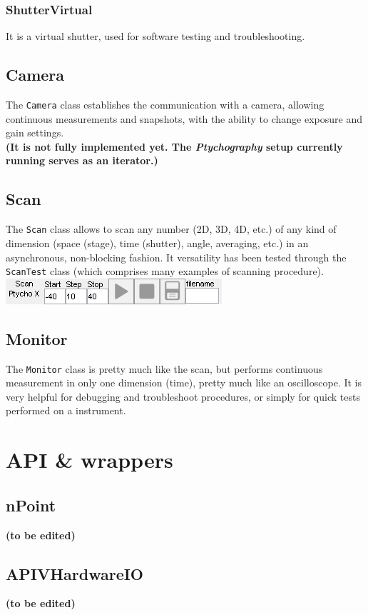 \documentclass[10pt,letter,twoside]{report}
\newcommand{\temp}[1] {{\bf (#1)}}
\begin{document}
\subsubsection{ShutterVirtual}
It is a virtual shutter, used for software testing and troubleshooting.

\subsection{Camera}
The \verb!Camera! class establishes the communication with a camera, allowing continuous measurements and snapshots, with the ability to change exposure and gain settings.\\
\temp{It is not fully implemented yet. The \emph{Ptychography} setup currently running serves as an iterator.}

\subsection{Scan}
The \verb!Scan! class allows to scan any number (2D, 3D, 4D, etc.) of any kind of dimension (space (stage), time (shutter), angle, averaging, etc.) in an asynchronous, non-blocking fashion. 
It versatility has been tested through the \verb!ScanTest! class (which comprises many examples of scanning procedure).\\
\includegraphics[scale=1]{img/met5gui-Scan.png}

\subsection{Monitor}
The \verb!Monitor! class is pretty much like the scan, but performs continuous measurement in only one dimension (time), pretty much like an oscilloscope. It is very helpful for debugging and troubleshoot procedures, or simply for quick tests performed on a instrument.

\section{API \& wrappers}
\subsection{nPoint}
\temp{to be edited}
\subsection{APIVHardwareIO}
\temp{to be edited}
\end{document}
